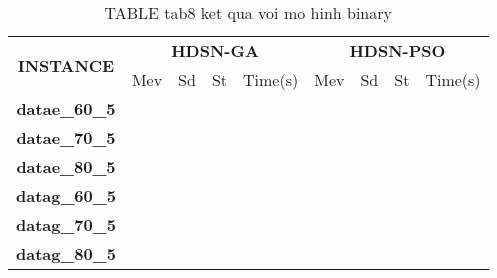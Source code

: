 \begin{table}{}
	\caption{TABLE tab8 ket qua voi mo hinh binary}
	\label{tab8}
	\centering
	\begin{tabular}{|c|c|c|c|c|c|c|c|c|}
		\hline
		\multirow{2}{*}{\textbf{INSTANCE}} & \multicolumn{4}{|c}{\textbf{HDSN-GA}} & \multicolumn{4}{|c|}{\textbf{HDSN-PSO}} \\ \cline{2-9}
		& Mev & Sd & St & Time(s) & Mev & Sd & St & Time(s) \\ \hline
		\textbf{datae\_60\_5} & & & & & & & & \\ \hline
		\textbf{datae\_70\_5} & & & & & & & & \\ \hline
		\textbf{datae\_80\_5} & & & & & & & & \\ \hline
		\textbf{datag\_60\_5} & & & & & & & & \\ \hline
		\textbf{datag\_70\_5} & & & & & & & & \\ \hline
		\textbf{datag\_80\_5} & & & & & & & & \\ \hline
	\end{tabular}
\end{table}
